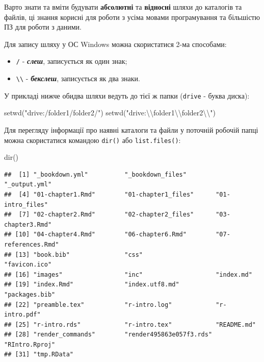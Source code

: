 \documentclass[
]{book}
\newenvironment{Shaded}{\begin{snugshade}}{\end{snugshade}}
\newcommand{\FunctionTok}[1]{\textcolor[rgb]{0.00,0.00,0.00}{#1}}
\newcommand{\NormalTok}[1]{#1}
\newcommand{\SpecialCharTok}[1]{\textcolor[rgb]{0.00,0.00,0.00}{#1}}
\newcommand{\StringTok}[1]{\textcolor[rgb]{0.31,0.60,0.02}{#1}}
\providecommand{\tightlist}{%
  \setlength{\itemsep}{0pt}\setlength{\parskip}{0pt}}
\begin{document}
Варто знати та вміти будувати \textbf{абсолютні} та \textbf{відносні} шляхи до каталогів та файлів, ці знання корисні для роботи з усіма мовами програмування та більшістю ПЗ для роботи з даними.

Для запису шляху у ОС Windows можна скористатися 2-ма способами:

\begin{itemize}
\tightlist
\item
  \texttt{/} - \textbf{\emph{слеш}}, записується як один знак;
\item
  \texttt{\textbackslash{}\textbackslash{}} - \textbf{\emph{бекслеш}}, записується як два знаки.
\end{itemize}

У прикладі нижче обидва шляхи ведуть до тієї ж папки (\texttt{drive} - буква диска):

\begin{Shaded}
\begin{Highlighting}[]
\FunctionTok{setwd}\NormalTok{(}\StringTok{"drive:/folder1/folder2/"}\NormalTok{)}
\FunctionTok{setwd}\NormalTok{(}\StringTok{"drive:}\SpecialCharTok{\textbackslash{}\textbackslash{}}\StringTok{folder1}\SpecialCharTok{\textbackslash{}\textbackslash{}}\StringTok{folder2}\SpecialCharTok{\textbackslash{}\textbackslash{}}\StringTok{"}\NormalTok{)}
\end{Highlighting}
\end{Shaded}

Для перегляду інформації про наявні каталоги та файли у поточній робочій папці можна скористатися командою \texttt{dir()} або \texttt{list.files()}:

\begin{Shaded}
\begin{Highlighting}[]
\FunctionTok{dir}\NormalTok{()}
\end{Highlighting}
\end{Shaded}

\begin{verbatim}
##  [1] "_bookdown.yml"          "_bookdown_files"        "_output.yml"           
##  [4] "01-chapter1.Rmd"        "01-chapter1_files"      "01-intro_files"        
##  [7] "02-chapter2.Rmd"        "02-chapter2_files"      "03-chapter3.Rmd"       
## [10] "04-chapter4.Rmd"        "06-chapter6.Rmd"        "07-references.Rmd"     
## [13] "book.bib"               "css"                    "favicon.ico"           
## [16] "images"                 "inc"                    "index.md"              
## [19] "index.Rmd"              "index.utf8.md"          "packages.bib"          
## [22] "preamble.tex"           "r-intro.log"            "r-intro.pdf"           
## [25] "r-intro.rds"            "r-intro.tex"            "README.md"             
## [28] "render_commands"        "render495863e057f3.rds" "RIntro.Rproj"          
## [31] "tmp.RData"
\end{verbatim}
\end{document}
